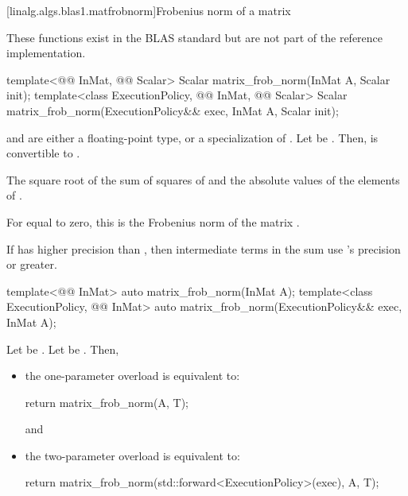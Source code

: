[linalg.algs.blas1.matfrobnorm]{Frobenius norm of a matrix}

\pnum
\begin{note}
These functions exist in the BLAS standard\supercite{blas-std}
but are not part of the reference implementation.
\end{note}

%
\begin{itemdecl}
template<@@ InMat, @@ Scalar>
  Scalar matrix_frob_norm(InMat A, Scalar init);
template<class ExecutionPolicy, @@ InMat, @@ Scalar>
  Scalar matrix_frob_norm(ExecutionPolicy&& exec, InMat A, Scalar init);
\end{itemdecl}

\begin{itemdescr}

\pnum
\mandates
{} and  are either a floating-point type, or
a specialization of .
Let  be
.
Then, 
is convertible to .

\pnum
\returns
The square root of the sum of squares
of  and the absolute values of the elements of .
\begin{note}
For  equal to zero,
this is the Frobenius norm of the matrix .
\end{note}

\pnum
\remarks
If  has higher precision
than ,
then intermediate terms in the sum use 's precision or greater.
\end{itemdescr}

%
\begin{itemdecl}
template<@@ InMat>
  auto matrix_frob_norm(InMat A);
template<class ExecutionPolicy, @@ InMat>
  auto matrix_frob_norm(ExecutionPolicy&& exec, InMat A);
\end{itemdecl}

\begin{itemdescr}
\pnum
\effects
Let  be
.
Let  be
.
Then,
\begin{itemize}
\item
the one-parameter overload is equivalent to:
\begin{codeblock}
return matrix_frob_norm(A, T{});
\end{codeblock}
and
\item
the two-parameter overload is equivalent to:
\begin{codeblock}
return matrix_frob_norm(std::forward<ExecutionPolicy>(exec), A, T{});
\end{codeblock}
\end{itemize}
\end{itemdescr}

